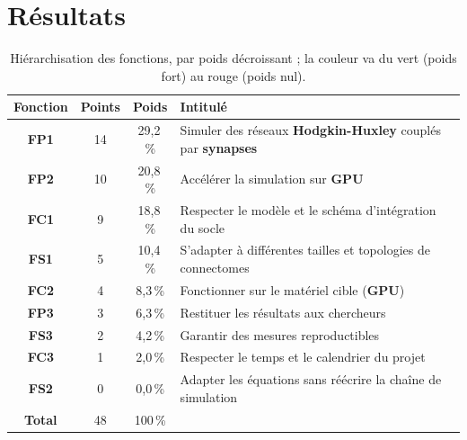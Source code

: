 \documentclass{report}
\begin{document}
\section{Résultats}

\begin{table}[H]
\centering
{\small
\begin{tabular}{|c|c|c|p{7.6cm}|}
\hline
\rowcolor{gray!15} \textbf{Fonction} & \textbf{Points} & \textbf{Poids} & \textbf{Intitulé} \\ \hline
\textbf{FP1} & \cellcolor{resVert} 14 & \cellcolor{resVert} 29,2\,\% & Simuler des réseaux \textbf{Hodgkin-Huxley} couplés par \textbf{synapses} \\ \hline
\textbf{FP2} & \cellcolor{resVert} 10 & \cellcolor{resVert} 20,8\,\% & Accélérer la simulation sur \textbf{GPU} \\ \hline
\textbf{FC1} & \cellcolor{resJaune} 9 & \cellcolor{resJaune} 18,8\,\% & Respecter le modèle et le schéma d'intégration du socle \\ \hline
\textbf{FS1} & \cellcolor{resJaune} 5 & \cellcolor{resJaune} 10,4\,\% & S'adapter à différentes tailles et topologies de connectomes \\ \hline
\textbf{FC2} & \cellcolor{resOrange} 4 & \cellcolor{resOrange} 8,3\,\% & Fonctionner sur le matériel cible (\textbf{GPU}) \\ \hline
\textbf{FP3} & \cellcolor{resOrange} 3 & \cellcolor{resOrange} 6,3\,\% & Restituer les résultats aux chercheurs \\ \hline
\textbf{FS3} & \cellcolor{resRougeC} 2 & \cellcolor{resRougeC} 4,2\,\% & Garantir des mesures reproductibles \\ \hline
\textbf{FC3} & \cellcolor{resRougeC} 1 & \cellcolor{resRougeC} 2,0\,\% & Respecter le temps et le calendrier du projet \\ \hline
\textbf{FS2} & \cellcolor{resRouge} 0 & \cellcolor{resRouge} 0,0\,\% & Adapter les équations sans réécrire la chaîne de simulation \\ \hline
\textbf{Total} & 48 & 100\,\% & \\ \hline
\end{tabular}}
\caption{Hiérarchisation des fonctions, par poids décroissant ; la couleur va du vert (poids fort) au rouge (poids nul).}
\label{tab:prio}
\end{table}
\end{document}
